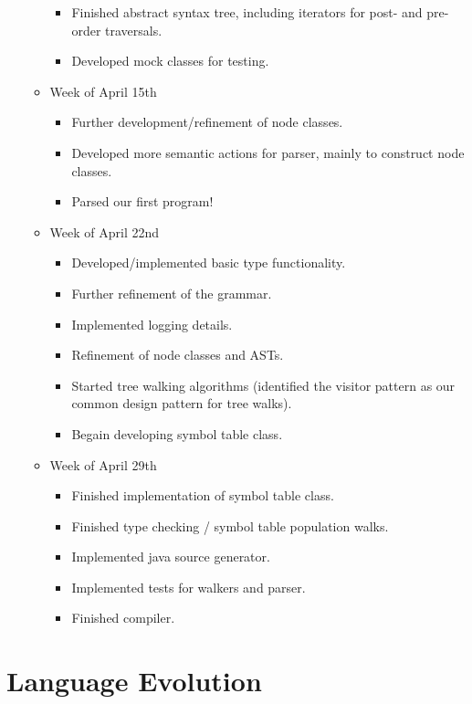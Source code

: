 \documentclass{report}
\begin{document}
\begin{itemize}
\begin{itemize}
\begin{itemize}
\item Finished abstract syntax tree, including iterators for post- and pre-order 
traversals.
\item Developed mock classes for testing.
\end{itemize}
\item[] Week of April 15th
\begin{itemize}
\item Further development/refinement of node classes.
\item Developed more semantic actions for parser, mainly to construct node classes.
\item Parsed our first program! 
\end{itemize}
\item[] Week of April 22nd
\begin{itemize}
\item Developed/implemented basic type functionality.
\item Further refinement of the grammar.
\item Implemented logging details. 
\item Refinement of node classes and ASTs.
\item Started tree walking algorithms (identified the visitor pattern as our
common design pattern for tree walks).
\item Begain developing symbol table class.
\end{itemize}
\item[] Week of April 29th
\begin{itemize}
\item Finished implementation of symbol table class.
\item Finished type checking / symbol table population walks.
\item Implemented java source generator.
\item Implemented tests for walkers and parser. 
\item Finished compiler.
\end{itemize}
\end{itemize} %
\end{itemize} %


\chapter{Language Evolution}
\label{chap:evo}
\end{document}
